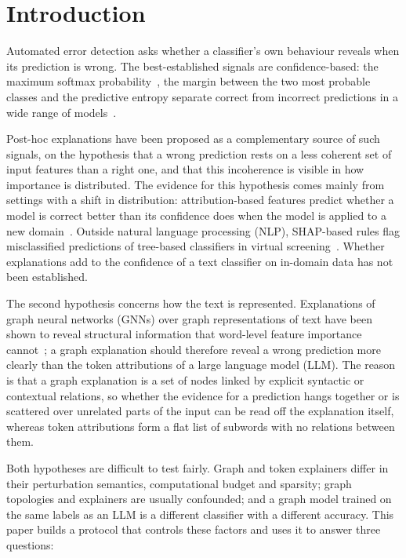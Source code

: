 \section{Introduction}\label{Introduction}

Automated error detection asks whether a classifier's own behaviour reveals when its prediction is wrong. The best-established signals are confidence-based: the maximum softmax probability~\cite{hendrycks2017baseline}, the margin between the two most probable classes and the predictive entropy separate correct from incorrect predictions in a wide range of models~\cite{corbiere2019confidnet}.

Post-hoc explanations have been proposed as a complementary source of such signals, on the hypothesis that a wrong prediction rests on a less coherent set of input features than a right one, and that this incoherence is visible in how importance is distributed. The evidence for this hypothesis comes mainly from settings with a shift in distribution: attribution-based features predict whether a model is correct better than its confidence does when the model is applied to a new domain~\cite{ye2022calibrating}. Outside natural language processing (NLP), SHAP-based rules flag misclassified predictions of tree-based classifiers in virtual screening~\cite{bernal2025shap}. Whether explanations add to the confidence of a text classifier on in-domain data has not been established.

The second hypothesis concerns how the text is represented. Explanations of graph neural networks (GNNs) over graph representations of text have been shown to reveal structural information that word-level feature importance cannot~\cite{yuan2021structured}; a graph explanation should therefore reveal a wrong prediction more clearly than the token attributions of a large language model (LLM). The reason is that a graph explanation is a set of nodes linked by explicit syntactic or contextual relations, so whether the evidence for a prediction hangs together or is scattered over unrelated parts of the input can be read off the explanation itself, whereas token attributions form a flat list of subwords with no relations between them.

Both hypotheses are difficult to test fairly. Graph and token explainers differ in their perturbation semantics, computational budget and sparsity; graph topologies and explainers are usually confounded; and a graph model trained on the same labels as an LLM is a different classifier with a different accuracy. This paper builds a protocol that controls these factors and uses it to answer three questions:

